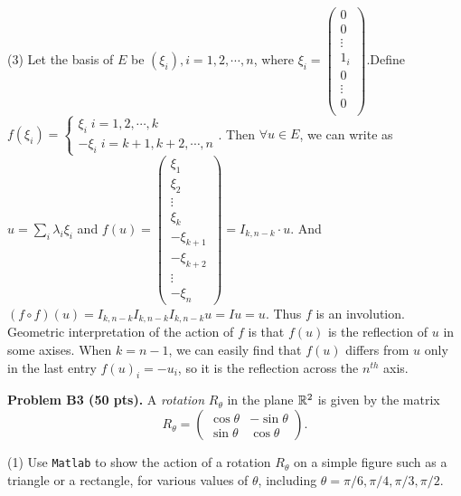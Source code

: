 \documentclass[12pt]{article}
\begin{document}
\medskip
(3)
Let the basis of $E$ be $(\xi_i), i = 1, 2, \cdots, n$, where $\xi_i = 
\begin{pmatrix}
0 \\
0 \\
\vdots \\
1_i \\
0 \\
\vdots \\
0 \\
\end{pmatrix}
$.Define \\
$
f(\xi_i) = \left \{
				\begin{array}{ll}
				\xi_i \; i = 1,2,\cdots,k \\
				-\xi_i \; i = k+1, k+2, \cdots, n				
				\end{array}
			\right.
$. Then $\forall u \in E$, we can write as $u = \sum_i \lambda_i \xi_i$ and $f(u) = 
\begin{pmatrix}
\xi_1 \\
\xi_2 \\
\vdots \\
\xi_k \\
-\xi_{k+1} \\
-\xi_{k+2} \\
\vdots \\
-\xi_n
\end{pmatrix} 
= I_{k , n - k} \cdot u
$. 
And $
(f \circ f)(u) = I_{k , n - k}I_{k , n - k}  I_{k , n - k}  u = I u = u
$. Thus $f$ is an involution.\\
Geometric interpretation of the action of $f$ is that $f(u)$ is the reflection of $u$ in some axises. When $k = n - 1$, we can easily find that $f(u)$ differs from $u$ only in the last entry $f(u)_i = -u_i$, so it is the reflection across the $n^{th}$ axis.

\vspace {0.5cm}\noindent
{\bf Problem B3 (50 pts).}
A {\it rotation\/} $R_{\theta}$ in the plane $\mathbb{R}^2$ is given  by
the matrix
\[
R_{\theta} =
\begin{pmatrix}
\cos\theta & -\sin\theta \\
\sin\theta & \cos\theta
\end{pmatrix}.
\]

\medskip
(1)
Use {\tt Matlab} to show the action of a rotation $R_{\theta}$
on a simple figure such as a triangle or a rectangle,
for various values of $\theta$, including
$\theta = \pi/6, \pi/4, \pi/3, \pi/2$.
\end{document}

